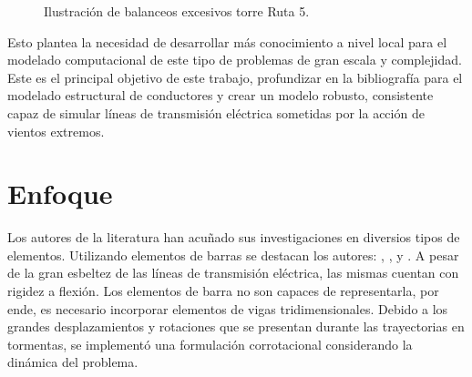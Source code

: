 \begin{figure}[htbp]
	\centering
	\def\svgwidth{80mm}
	
	\caption{Ilustración de balanceos excesivos torre Ruta 5.}
	\label{fig:INTRO:IlusExcesiveBalance}
\end{figure}  


Esto plantea la necesidad de desarrollar más conocimiento a nivel local para el modelado computacional de este tipo de problemas de gran escala y complejidad. Este es el principal objetivo de este trabajo, profundizar en la bibliografía para el modelado estructural de conductores y crear un modelo robusto, consistente capaz de simular líneas de transmisión eléctrica sometidas por la acción de vientos extremos.



\section{Enfoque}

Los autores de la literatura han acuñado sus investigaciones en diversios tipos de elementos. Utilizando elementos de barras se destacan los autores: \cite{desai1995finite}, \cite{yan2009numerical}, \cite{gani2010dynamic} y \cite{yang2016nonlinear}. A pesar de la gran esbeltez de las líneas de transmisión eléctrica, las mismas cuentan con rigidez a flexión. Los elementos de barra no son capaces de representarla, por ende, es necesario incorporar elementos de vigas tridimensionales. Debido a los grandes desplazamientos y rotaciones que se presentan durante las trayectorias en tormentas, se implementó una formulación corrotacional considerando la dinámica del problema.

